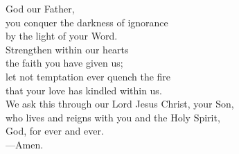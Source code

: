 \prayer


\begin{prayerverse}
God our Father,\\
you conquer the darkness of ignorance\\
by the light of your Word.\\
Strengthen within our hearts\\
the faith you have given us;\\
let not temptation ever quench the fire\\
that your love has kindled within us.\\
We ask this through our Lord Jesus Christ, your Son,\\
who lives and reigns with you and the Holy Spirit,\\
God, for ever and ever.\\
{\color{red}---\thinspace}Amen.
\end{prayerverse}


